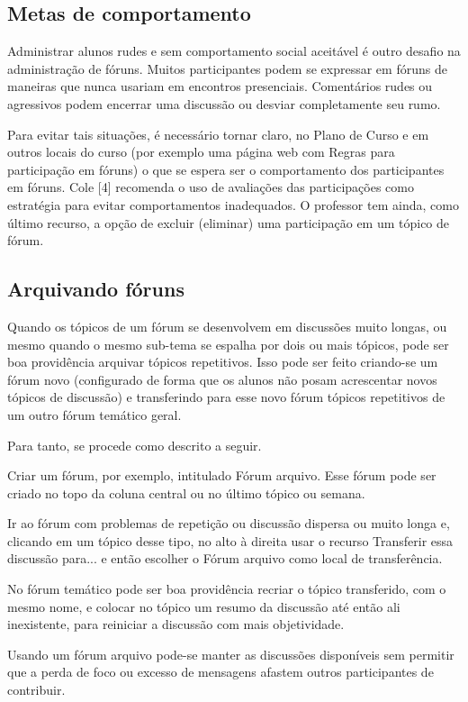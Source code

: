 \subsection{Metas de comportamento}
Administrar alunos rudes e sem comportamento social aceitável é outro desafio na administração de fóruns. Muitos participantes podem se expressar em fóruns de maneiras que nunca usariam em encontros presenciais. Comentários rudes ou agressivos podem encerrar uma discussão ou desviar completamente seu rumo.

Para evitar tais situações, é necessário tornar claro, no Plano de Curso e em outros locais do curso (por exemplo uma página web com Regras para participação em fóruns) o que se espera ser o comportamento dos participantes em fóruns. Cole [4] recomenda o uso de avaliações das participações como estratégia para evitar comportamentos inadequados. O professor tem ainda, como último recurso, a opção de excluir (eliminar) uma participação em um tópico de fórum.

\subsection{Arquivando fóruns}

Quando  os tópicos de um fórum se desenvolvem em discussões muito longas, ou mesmo quando o mesmo sub-tema se espalha por dois ou mais tópicos, pode ser boa providência arquivar tópicos repetitivos. Isso pode ser feito criando-se um fórum novo (configurado de forma que os alunos não posam acrescentar novos tópicos de discussão) e transferindo para esse novo fórum tópicos repetitivos de um outro fórum temático geral.

Para tanto, se procede como descrito a seguir.

Criar um fórum, por exemplo, intitulado Fórum arquivo. Esse fórum pode ser criado no topo da coluna central ou no último tópico ou semana.

Ir ao fórum com problemas de repetição ou discussão dispersa ou muito longa e, clicando em um tópico desse tipo, no alto à direita usar o recurso Transferir essa discussão para... e então escolher o Fórum arquivo  como local de transferência.

No fórum temático pode ser boa providência recriar o tópico transferido, com o mesmo nome, e colocar no tópico um resumo da discussão até então ali inexistente, para reiniciar a discussão  com mais objetividade.

Usando um fórum arquivo pode-se manter as discussões disponíveis sem permitir que a perda de foco ou excesso de mensagens afastem outros participantes de contribuir.

